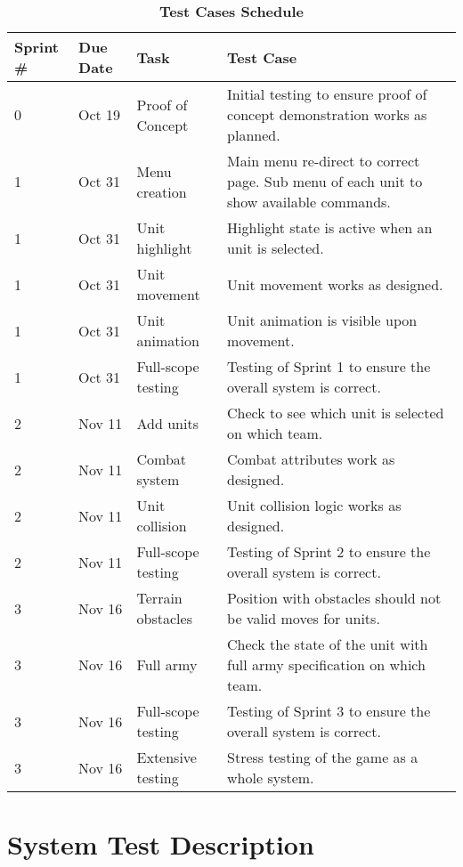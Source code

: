 \documentclass{article}
\begin{document}
\begin{table}[H]
\caption{\textbf{Test Cases Schedule}}
\begin{tabularx}{\textwidth}{lllX}
    \toprule
    \textbf{Sprint \#} & \textbf{Due Date} & \textbf{Task} & \textbf{Test Case} \\
    \midrule
    0 & Oct 19 & Proof of Concept & Initial testing to ensure proof of concept demonstration works as planned. \\
    1 & Oct 31 & Menu creation & Main menu re-direct to correct page. Sub menu of each unit to show available commands. \\
    1 & Oct 31 & Unit highlight & Highlight state is active when an unit is selected. \\
    1 & Oct 31 & Unit movement & Unit movement works as designed. \\
    1 & Oct 31 & Unit animation & Unit animation is visible upon movement. \\
    1 & Oct 31 & Full-scope testing & Testing of Sprint 1 to ensure the overall system is correct. \\
    2 & Nov 11 & Add units & Check to see which unit is selected on which team. \\
    2 & Nov 11 & Combat system & Combat attributes work as designed. \\
    2 & Nov 11 & Unit collision &  Unit collision logic works as designed. \\
    2 & Nov 11 & Full-scope testing & Testing of Sprint 2 to ensure the overall system is correct. \\
    3 & Nov 16 & Terrain obstacles & Position with obstacles should not be valid moves for units. \\
    3 & Nov 16 & Full army & Check the state of the unit with full army specification on which team. \\
    3 & Nov 16 & Full-scope testing & Testing of Sprint 3 to ensure the overall system is correct. \\
    3 & Nov 16 & Extensive testing & Stress testing of the game as a whole system. \\
    \bottomrule
\end{tabularx}
\end{table}

\newpage

\section{System Test Description}
	
\end{document}
